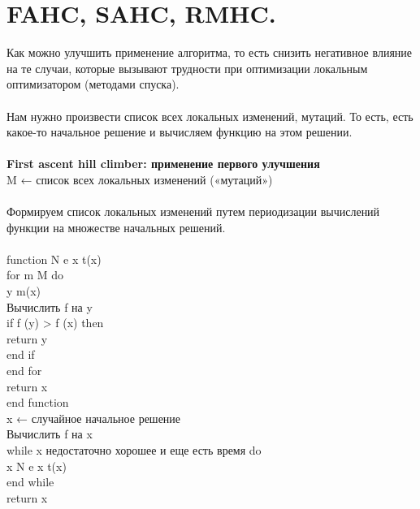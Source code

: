 \newcommand\tab[1][1cm]{\hspace*{#1}}
\section{FAHC, SAHC, RMHC.}

Как можно улучшить применение алгоритма, то есть снизить негативное влияние на те случаи, которые вызывают трудности при оптимизации локальным оптимизатором (методами спуска).\\
\\
Нам нужно произвести список всех локальных изменений, мутаций. То есть, есть какое-то начальное решение и вычисляем функцию на этом решении. \\ 
\\
\textbf{First ascent hill climber: применение первого улучшения}
\\
M ← список всех локальных изменений («мутаций») \\
\\
Формируем список локальных изменений путем периодизации 
вычислений функции на множестве начальных решений. \\
\\
function N e x t(x)  \\
\tab for m \leftarrow M do  \\
\tab \tab y \leftarrow m(x)  \\
\tab \tab Вычислить f на y  \\
\tab \tab if f (y) > f (x) then  \\
\tab \tab \tab return y  \\
\tab \tab end if \\ 
\tab end for  \\
\tab return x  \\
end function  \\

x ← случайное начальное решение  \\
Вычислить f на x  \\
while x недостаточно хорошее и еще есть  время do  \\
\tab x \leftarrow N e x t(x)  \\
end while  \\
return x \\ 

